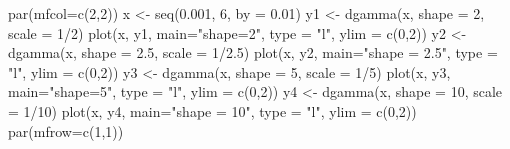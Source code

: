 \begin{Schunk}
\begin{Sinput}
 par(mfcol=c(2,2))
 x <- seq(0.001, 6, by = 0.01)
 y1 <- dgamma(x, shape = 2, scale = 1/2)
 plot(x, y1, main="shape=2", type = "l", ylim = c(0,2))
 y2 <- dgamma(x, shape = 2.5, scale = 1/2.5)
 plot(x, y2, main="shape = 2.5", type = "l", ylim = c(0,2))
 y3 <- dgamma(x, shape = 5, scale = 1/5)
 plot(x, y3, main="shape=5", type = "l", ylim = c(0,2))
 y4 <- dgamma(x, shape = 10, scale = 1/10)
 plot(x, y4, main="shape = 10", type = "l", ylim = c(0,2))
 par(mfrow=c(1,1))
\end{Sinput}
\end{Schunk}
